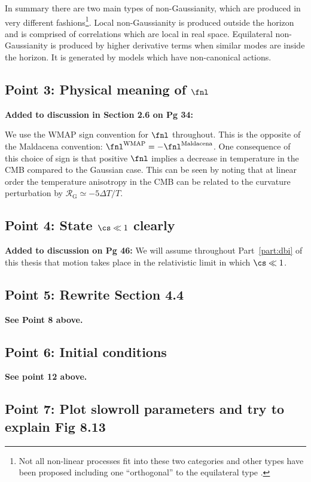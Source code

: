 In summary there are two main types of non-Gaussianity, which are produced in very different
fashions\footnote{Not all non-linear processes fit into these two categories and other types have
been proposed including one ``orthogonal'' to the equilateral type \cite{Senatore:2009gt}.}. Local
non-Gaussianity is produced outside the horizon and is comprised of correlations which are local in
real space. Equilateral non-Gaussianity is produced by higher derivative terms when similar modes
are inside the horizon. It is generated by models which have non-canonical actions.


\subsection{Point 3: Physical meaning of \texorpdfstring{$\fnl$}{fNL}}
\textbf{Added to discussion in Section 2.6 on Pg 34:}

We use the WMAP sign convention for $\fnl$ throughout. 
This is the opposite of the Maldacena convention:
$\fnl^\mathrm{WMAP}=-\fnl^\mathrm{Maldacena}$. One consequence of this choice of sign is that
positive $\fnl$ implies a decrease in temperature in the CMB compared to the Gaussian case. This
can be seen by noting that at linear order the temperature anisotropy in the CMB can be related to
the curvature perturbation by $\mathcal{R}_\mathrm{G}\simeq -5 \Delta T/T$.

\subsection{Point 4: State \texorpdfstring{$\cs\ll 1$}{cs<<1} clearly}
\textbf{Added to discussion on Pg 46:}
We will assume throughout Part~\ref{part:dbi} of this thesis that motion takes
place in the relativistic limit in which $\cs\ll1$.

\subsection{Point 5: Rewrite Section 4.4}
\textbf{See Point 8 above.}

\subsection{Point 6: Initial conditions}
\textbf{See point 12 above.}

\subsection{Point 7: Plot slowroll parameters and try to explain Fig 8.13}

